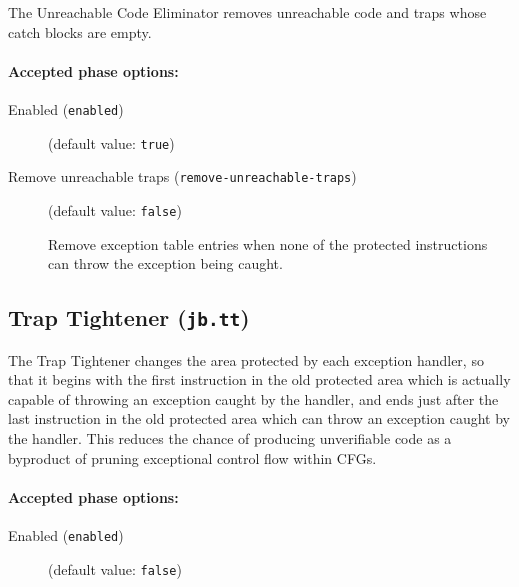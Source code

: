 \documentclass{article}
\begin{document}
The Unreachable Code Eliminator removes unreachable code and
traps whose catch blocks are empty.


\paragraph{Accepted phase options:} 

\begin{description}

\item[Enabled ({\tt enabled})]
(default value: {\tt true})






\item[Remove unreachable traps ({\tt remove-unreachable-traps})]
(default value: {\tt false})




Remove exception table entries when none of the protected instructions can
throw the exception being caught.



\end{description}

\subsection{Trap Tightener ({\tt jb.tt})}

The Trap Tightener changes the area protected by each exception handler,
so that it begins with the first instruction in the old protected
area which is actually capable of throwing an exception caught by the
handler, and ends just after the last instruction in the old
protected area which can throw an exception caught by the
handler.  This reduces the chance of producing unverifiable code
as a byproduct of pruning exceptional control flow within CFGs.


\paragraph{Accepted phase options:} 

\begin{description}

\item[Enabled ({\tt enabled})]
(default value: {\tt false})






\end{description}
\end{document}

